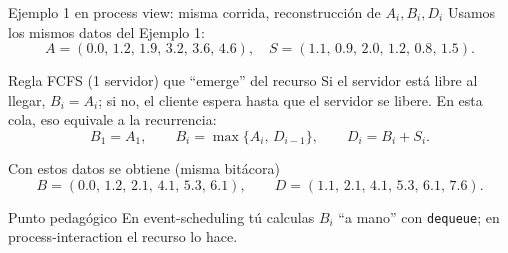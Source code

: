 \documentclass[aspectratio=1610, 9pt]{beamer}
\begin{document}
\begin{frame}{Ejemplo 1 en process view: misma corrida, reconstrucción de $A_i,B_i,D_i$}
\small
Usamos los mismos datos del Ejemplo 1:
\[
A=(0.0,\,1.2,\,1.9,\,3.2,\,3.6,\,4.6),\quad
S=(1.1,\,0.9,\,2.0,\,1.2,\,0.8,\,1.5).
\]

\vspace{4pt}
\begin{block}{Regla FCFS (1 servidor) que “emerge” del recurso}
Si el servidor está libre al llegar, $B_i=A_i$; si no, el cliente espera hasta que el servidor se libere.
En esta cola, eso equivale a la recurrencia:
\[
B_1=A_1,\qquad
B_i=\max\{A_i,\,D_{i-1}\},\qquad
D_i=B_i+S_i.
\]
\end{block}

\vspace{2pt}
\begin{block}{Con estos datos se obtiene (misma bitácora)}
\[
B=(0.0,\,1.2,\,2.1,\,4.1,\,5.3,\,6.1),\qquad
D=(1.1,\,2.1,\,4.1,\,5.3,\,6.1,\,7.6).
\]
\end{block}

\vspace{2pt}
\begin{alertblock}{Punto pedagógico}
En event-scheduling tú calculas $B_i$ “a mano” con \texttt{dequeue}; en process-interaction el recurso lo hace.
\end{alertblock}
\end{frame}
\end{document}
